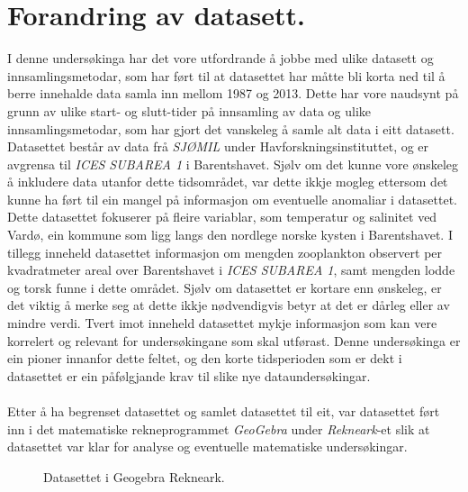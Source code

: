 \documentclass{report}
\begin{document}
\section{Forandring av datasett.}
I denne undersøkinga har det vore utfordrande å jobbe med ulike datasett og innsamlingsmetodar, som har ført til at datasettet har måtte bli korta ned til å berre innehalde data samla inn mellom 1987 og 2013. Dette har vore naudsynt på grunn av ulike start- og slutt-tider på innsamling av data og ulike innsamlingsmetodar, som har gjort det vanskeleg å samle alt data i eitt datasett. Datasettet består av data frå \textit{SJØMIL} under Havforskningsinstituttet, og er avgrensa til \textit{ICES SUBAREA 1} i Barentshavet. Sjølv om det kunne vore ønskeleg å inkludere data utanfor dette tidsområdet, var dette ikkje mogleg ettersom det kunne ha ført til ein mangel på informasjon om eventuelle anomaliar i datasettet.
Dette datasettet fokuserer på fleire variablar, som temperatur og salinitet ved Vardø, ein kommune som ligg langs den nordlege norske kysten i Barentshavet. I tillegg inneheld datasettet informasjon om mengden zooplankton observert per kvadratmeter areal over Barentshavet i \textit{ICES SUBAREA 1}, samt mengden lodde og torsk funne i dette området.
Sjølv om datasettet er kortare enn ønskeleg, er det viktig å merke seg at dette ikkje nødvendigvis betyr at det er dårleg eller av mindre verdi. Tvert imot inneheld datasettet mykje informasjon som kan vere korrelert og relevant for undersøkingane som skal utførast. Denne undersøkinga er ein pioner innanfor dette feltet, og den korte tidsperioden som er dekt i datasettet er ein påfølgjande krav til slike nye dataundersøkingar. \\
\\
Etter å ha begrenset datasettet og samlet datasettet til eit, var datasettet ført inn i det matematiske rekneprogrammet \textit{GeoGebra} under \textit{Rekneark}-et slik at datasettet var klar for analyse og eventuelle matematiske undersøkingar.
\begin{figure}[H]
	\centering
	\caption{Datasettet i Geogebra Rekneark.}
	\label{F2}
\end{figure}\newpage
\end{document}
